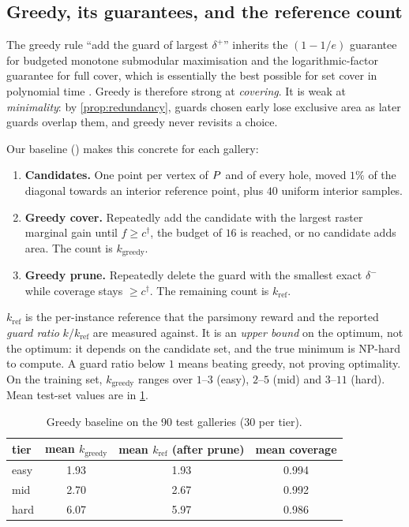 \documentclass[11pt,a4paper]{article}
\begin{document}
\subsection{Greedy, its guarantees, and the reference count}\label{sec:greedy}

The greedy rule ``add the guard of largest $\delta^+$'' inherits the $(1-1/e)$ guarantee for
budgeted monotone submodular maximisation \cite{nemhauser1978} and the logarithmic-factor
guarantee for full cover, which is essentially the best possible for set cover in polynomial
time \cite{feige1998}. Greedy is therefore strong at \emph{covering}. It is weak at
\emph{minimality}: by \cref{prop:redundancy}, guards chosen early lose exclusive area as
later guards overlap them, and greedy never revisits a choice.

Our baseline () makes this concrete for each gallery:
\begin{enumerate}
  \item \textbf{Candidates.} One point per vertex of $P$ and of every hole, moved $1\%$
        of the diagonal towards an interior reference point, plus $40$ uniform interior
        samples.
  \item \textbf{Greedy cover.} Repeatedly add the candidate with the largest raster marginal
        gain until $f\ge c^\dagger$, the budget of $16$ is reached, or no candidate adds
        area. The count is $k_{\mathrm{greedy}}$.
  \item \textbf{Greedy prune.} Repeatedly delete the guard with the smallest exact
        $\delta^-$ while coverage stays $\ge c^\dagger$. The remaining count is
        $k_{\mathrm{ref}}$.
\end{enumerate}

$k_{\mathrm{ref}}$ is the per-instance reference that the parsimony reward and the reported
\emph{guard ratio} $k/k_{\mathrm{ref}}$ are measured against. It is an \emph{upper bound} on
the optimum, not the optimum: it depends on the candidate set, and the true minimum is
NP-hard to compute. A guard ratio below $1$ means beating greedy, not proving optimality.
On the training set, $k_{\mathrm{greedy}}$ ranges over $1$--$3$ (easy), $2$--$5$ (mid) and
$3$--$11$ (hard). Mean test-set values are in \cref{tab:greedy}.

\begin{table}[!htbp]
\centering\small
\caption{Greedy baseline on the 90 test galleries (30 per tier).}
\label{tab:greedy}
\begin{tabular}{lccc}
\toprule
tier & mean $k_{\mathrm{greedy}}$ & mean $k_{\mathrm{ref}}$ (after prune) & mean coverage \\
\midrule
easy & 1.93 & 1.93 & 0.994 \\
mid  & 2.70 & 2.67 & 0.992 \\
hard & 6.07 & 5.97 & 0.986 \\
\bottomrule
\end{tabular}
\end{table}
\end{document}
